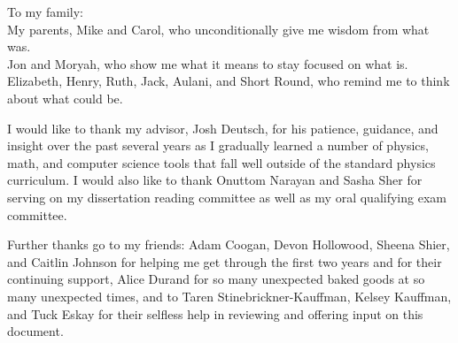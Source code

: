 \documentclass[11pt]{ucthesis}
\begin{document}
\begin{frontmatter}
\begin{dedication}
\null\vfil
{\large
\begin{center}
To my family:\\\vspace{24pt}
My parents, Mike and Carol, who unconditionally give me wisdom from what was.\\\vspace{24pt}
Jon and Moryah, who show me what it means to stay focused on what is.\\\vspace{24pt}
Elizabeth, Henry, Ruth, Jack, Aulani, and Short Round, who remind me to think about what could be.
\end{center}}
\vfil\null
\end{dedication}


\begin{acknowledgements}

I would like to thank my advisor, Josh Deutsch, for his patience, guidance, and insight over the past several years as I gradually learned a number of physics, math, and computer science tools that fall well outside of the standard physics curriculum. I would also like to thank Onuttom Narayan and Sasha Sher for serving on my dissertation reading committee as well as my oral qualifying exam committee.

Further thanks go to my friends: Adam Coogan, Devon Hollowood, Sheena Shier, and Caitlin Johnson for helping me get through the first two years and for their continuing support, Alice Durand for so many unexpected baked goods at so many unexpected times, and to Taren Stinebrickner-Kauffman, Kelsey Kauffman, and Tuck Eskay for their selfless help in reviewing and offering input on this document. 


\end{acknowledgements}
\end{frontmatter}
\end{document}
